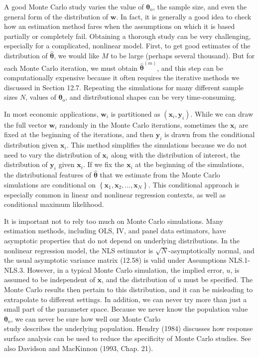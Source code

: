 \documentclass[10pt]{article}
\begin{document}
A good Monte Carlo study varies the value of $\boldsymbol{\theta}_{\mathrm{o}}$, the sample size, and even the general form of the distribution of $\mathbf{w}$. In fact, it is generally a good idea to check how an estimation method fares when the assumptions on which it is based partially or completely fail. Obtaining a thorough study can be very challenging, especially for a complicated, nonlinear model. First, to get good estimates of the distribution of $\hat{\boldsymbol{\theta}}$, we would like $M$ to be large (perhaps several thousand). But for each Monte Carlo iteration, we must obtain $\hat{\boldsymbol{\theta}}^{(m)}$, and this step can be computationally expensive because it often requires the iterative methods we discussed in Section 12.7. Repeating the simulations for many different sample sizes $N$, values of $\boldsymbol{\theta}_{\mathrm{o}}$, and distributional shapes can be very time-consuming.

In most economic applications, $\mathbf{w}_{i}$ is partitioned as $\left(\mathbf{x}_{i}, \mathbf{y}_{i}\right)$. While we can draw the full vector $\mathbf{w}_{i}$ randomly in the Monte Carlo iterations, sometimes the $\mathbf{x}_{i}$ are fixed at the beginning of the iterations, and then $\mathbf{y}_{i}$ is drawn from the conditional distribution given $\mathbf{x}_{i}$. This method simplifies the simulations because we do not need to vary the distribution of $\mathbf{x}_{i}$ along with the distribution of interest, the distribution of $\mathbf{y}_{i}$ given $\mathbf{x}_{i}$. If we fix the $\mathbf{x}_{i}$ at the beginning of the simulations, the distributional features of $\hat{\boldsymbol{\theta}}$ that we estimate from the Monte Carlo simulations are conditional on $\left\{\mathbf{x}_{1}, \mathbf{x}_{2}, \ldots, \mathbf{x}_{N}\right\}$. This conditional approach is especially common in linear and nonlinear regression contexts, as well as conditional maximum likelihood.

It is important not to rely too much on Monte Carlo simulations. Many estimation methods, including OLS, IV, and panel data estimators, have asymptotic properties that do not depend on underlying distributions. In the nonlinear regression model, the NLS estimator is $\sqrt{N}$-asymptotically normal, and the usual asymptotic variance matrix (12.58) is valid under Assumptions NLS.1-NLS.3. However, in a typical Monte Carlo simulation, the implied error, $u$, is assumed to be independent of $\mathbf{x}$, and the distribution of $u$ must be specified. The Monte Carlo results then pertain to this distribution, and it can be misleading to extrapolate to different settings. In addition, we can never try more than just a small part of the parameter space. Because we never know the population value $\boldsymbol{\theta}_{\mathrm{o}}$, we can never be sure how well our Monte Carlo\\
study describes the underlying population. Hendry (1984) discusses how response surface analysis can be used to reduce the specificity of Monte Carlo studies. See also Davidson and MacKinnon (1993, Chap. 21).
\end{document}
